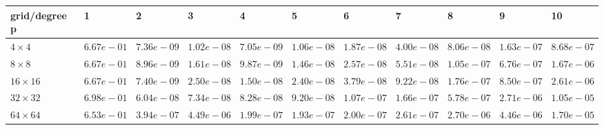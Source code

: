 \begin{tabular}{lllllllllll}
\hline
 grid/degree p   & 1          & 2          & 3          & 4          & 5          & 6          & 7          & 8          & 9          & 10         \\
\hline
 $4 \times 4$    & $6.67e-01$ & $7.36e-09$ & $1.02e-08$ & $7.05e-09$ & $1.06e-08$ & $1.87e-08$ & $4.00e-08$ & $8.06e-08$ & $1.63e-07$ & $8.68e-07$ \\
 $8 \times 8$    & $6.67e-01$ & $8.96e-09$ & $1.61e-08$ & $9.87e-09$ & $1.46e-08$ & $2.57e-08$ & $5.51e-08$ & $1.05e-07$ & $6.76e-07$ & $1.67e-06$ \\
 $16 \times 16$  & $6.67e-01$ & $7.40e-09$ & $2.50e-08$ & $1.50e-08$ & $2.40e-08$ & $3.79e-08$ & $9.22e-08$ & $1.76e-07$ & $8.50e-07$ & $2.61e-06$ \\
 $32 \times 32$  & $6.98e-01$ & $6.04e-08$ & $7.34e-08$ & $8.28e-08$ & $9.20e-08$ & $1.07e-07$ & $1.66e-07$ & $5.78e-07$ & $2.71e-06$ & $1.05e-05$ \\
 $64 \times 64$  & $6.53e-01$ & $3.94e-07$ & $4.49e-06$ & $1.99e-07$ & $1.93e-07$ & $2.00e-07$ & $2.61e-07$ & $2.70e-06$ & $4.46e-06$ & $1.70e-05$ \\
\hline
\end{tabular}